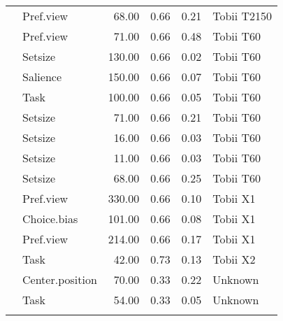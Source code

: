 \begin{longtable}{llrrrl}
  \cite{orquin2013} & Pref.view & 68.00 & 0.66 & 0.21 & Tobii T2150 \\ 
  \cite{ares2014} & Pref.view & 71.00 & 0.66 & 0.48 & Tobii T60 \\ 
  \cite{grebitus2015} & Setsize & 130.00 & 0.66 & 0.02 & Tobii T60 \\ 
  \cite{orquin2015a} & Salience & 150.00 & 0.66 & 0.07 & Tobii T60 \\ 
  \cite{orquin2015a} & Task & 100.00 & 0.66 & 0.05 & Tobii T60 \\ 
  \cite{orquin2020osfb} & Setsize & 71.00 & 0.66 & 0.21 & Tobii T60 \\ 
  \cite{orquin2020osfb} & Setsize & 16.00 & 0.66 & 0.03 & Tobii T60 \\ 
  \cite{orquin2020osfb} & Setsize & 11.00 & 0.66 & 0.03 & Tobii T60 \\ 
  \cite{orquin2020osfb} & Setsize & 68.00 & 0.66 & 0.25 & Tobii T60 \\ 
  \cite{behe2014} & Pref.view & 330.00 & 0.66 & 0.10 & Tobii X1 \\ 
  \cite{behe2015} & Choice.bias & 101.00 & 0.66 & 0.08 & Tobii X1 \\ 
  \cite{behe2017} & Pref.view & 214.00 & 0.66 & 0.17 & Tobii X1 \\ 
  \cite{hwang2017} & Task & 42.00 & 0.73 & 0.13 & Tobii X2 \\ 
  \cite{meissner2016a} & Center.position & 70.00 & 0.33 & 0.22 & Unknown \\ 
  \cite{pieters1999} & Task & 54.00 & 0.33 & 0.05 & Unknown \\ 
  \hline
\label{tab:overviewtable}
\end{longtable}
